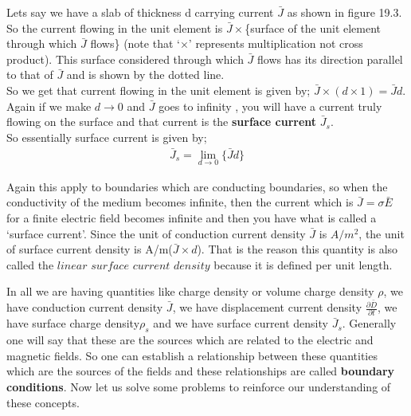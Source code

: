 Lets say we have a slab of thickness d carrying current $\bar{J}$ as shown in figure 19.3. So the current flowing in the unit element is $\bar{J}\times$\{surface of the unit element through which $\bar{J}$ flows\} (note that `$\times$' represents multiplication not cross product).
This surface considered through which $\bar{J}$ flows has its direction parallel to that of $\bar{J}$ and is shown by the dotted line.\\ 
So we get that current flowing in the unit element is given by; $\bar{J}\times(d\times1)=\bar{J}d$. Again if we make $d\rightarrow0$ and $\bar{J}$ goes to infinity , you will have a current truly flowing on the surface and that current is the \textbf{surface current} $\bar{J}_{s}$. \\
So essentially surface current is given by;
\begin{align}
\bar{J}_{s}=\lim_{d\rightarrow0}\{\bar{J}d\}
\end{align}


Again this apply to boundaries which are conducting boundaries, so when the conductivity of the medium becomes infinite, then the current which is $\bar{J}=\sigma\bar{E}$ for a finite electric field becomes infinite and then you have what is called a `surface current'. Since the unit of conduction current density $\bar{J}$ is $A/m^{2}$, the unit of surface current density is A/m($\bar{J}\times d$). That is the reason this quantity is also called the $linear$ $surface$ $current$ $density$ because it is defined per unit length.


In all we are having quantities like charge density or volume charge density $\rho$, we have conduction current density $\bar{J}$, we have displacement current density $\frac{\partial\bar{D}}{\partial t}$, we have surface charge density$\rho_{s}$ and we have surface current density $\bar{J}_{s}$. Generally one will say that these are the sources which are related to the electric and magnetic fields. So one can establish a relationship between these quantities which are the sources of the fields and these relationships are called \textbf{ boundary conditions}. Now let us solve some problems to reinforce our understanding of these concepts.

